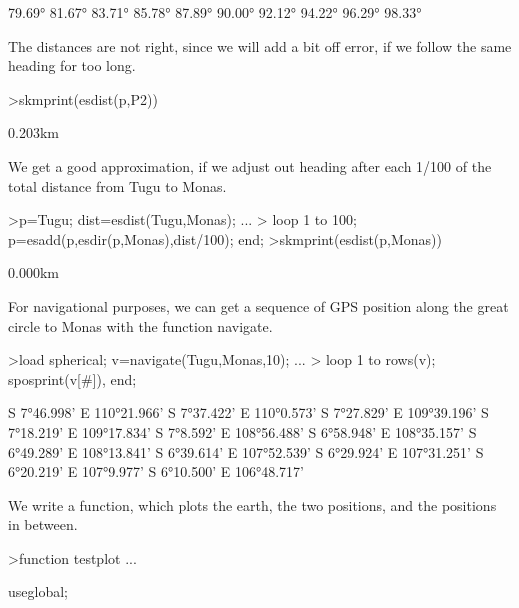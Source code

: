 \documentclass[a4paper,10pt]{article}
\begin{document}
\begin{eulernotebook}
\begin{eulercomment}
\begin{eulercomment}
\begin{eulercomment}
\begin{eulercomment}
\begin{eulercomment}
\begin{eulercomment}
\begin{euleroutput}
       79.69°
       81.67°
       83.71°
       85.78°
       87.89°
       90.00°
       92.12°
       94.22°
       96.29°
       98.33°
\end{euleroutput}
\begin{eulercomment}
The distances are not right, since we will add a bit off error, if we
follow the same heading for too long.
\end{eulercomment}
\begin{eulerprompt}
>skmprint(esdist(p,P2))
\end{eulerprompt}
\begin{euleroutput}
       0.203km
\end{euleroutput}
\begin{eulercomment}
We get a good approximation, if we adjust out heading after each 1/100 of the total distance
from Tugu to Monas.
\end{eulercomment}
\begin{eulerprompt}
>p=Tugu; dist=esdist(Tugu,Monas); ...
>  loop 1 to 100; p=esadd(p,esdir(p,Monas),dist/100); end;
>skmprint(esdist(p,Monas))
\end{eulerprompt}
\begin{euleroutput}
       0.000km
\end{euleroutput}
\begin{eulercomment}
For navigational purposes, we can get a sequence of GPS position along the great circle to
Monas with the function navigate.
\end{eulercomment}
\begin{eulerprompt}
>load spherical; v=navigate(Tugu,Monas,10); ...
>  loop 1 to rows(v); sposprint(v[#]), end;
\end{eulerprompt}
\begin{euleroutput}
  S 7°46.998' E 110°21.966'
  S 7°37.422' E 110°0.573'
  S 7°27.829' E 109°39.196'
  S 7°18.219' E 109°17.834'
  S 7°8.592' E 108°56.488'
  S 6°58.948' E 108°35.157'
  S 6°49.289' E 108°13.841'
  S 6°39.614' E 107°52.539'
  S 6°29.924' E 107°31.251'
  S 6°20.219' E 107°9.977'
  S 6°10.500' E 106°48.717'
\end{euleroutput}
\begin{eulercomment}
We write a function, which plots the earth, the two positions, and the
positions in between.
\end{eulercomment}
\begin{eulerprompt}
>function testplot ...
\end{eulerprompt}
\begin{eulerudf}
  useglobal;

\end{eulerudf}
\end{eulercomment}
\end{eulercomment}
\end{eulercomment}
\end{eulercomment}
\end{eulercomment}
\end{eulercomment}
\end{eulernotebook}
\end{document}
